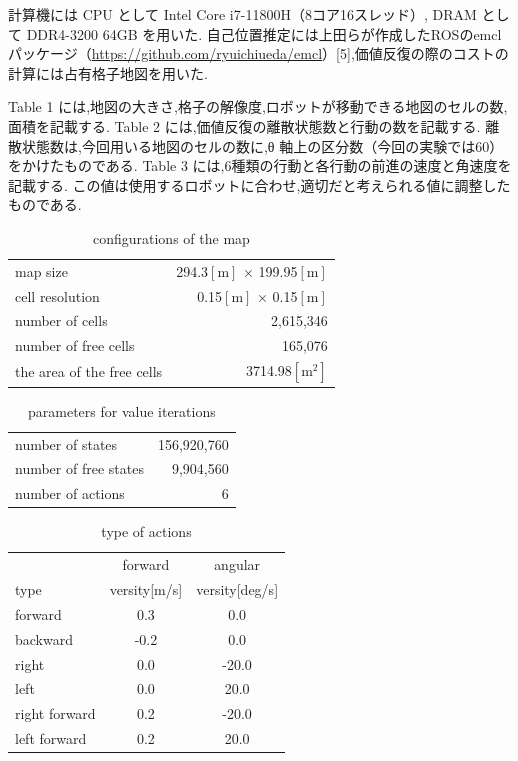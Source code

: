 \documentclass{jarticle}
\begin{document}
計算機には CPU として Intel Core i7-11800H（8コア16スレッド）, DRAM として DDR4-3200 64GB を用いた.
自己位置推定には上田らが作成したROSのemclパッケージ（\href{https://github.com/ryuichiueda/emcl}{https://github.com/ryuichiueda/emcl}）[5],価値反復の際のコストの計算には占有格子地図を用いた.

Table 1 には,地図の大きさ,格子の解像度,ロボットが移動できる地図のセルの数,面積を記載する.
Table 2 には,価値反復の離散状態数と行動の数を記載する.
離散状態数は,今回用いる地図のセルの数に,θ 軸上の区分数（今回の実験では60）をかけたものである.
Table 3 には,6種類の行動と各行動の前進の速度と角速度を記載する.
この値は使用するロボットに合わせ,適切だと考えられる値に調整したものである.

\begin{table}[hbtp]
  \caption{conﬁgurations of the map}
  \centering
  \begin{tabular}{l|r}
    \hline
    map size & 294.3$\mathrm{[m]}$ × 199.95$\mathrm{[m]}$\\
    cell resolution &  0.15$\mathrm{[m]}$ × 0.15$\mathrm{[m]}$ \\
		number of cells & 2,615,346\\
    number of free cells & 165,076\\
		the area of the free cells & 3714.98$\mathrm{[m^2]}$\\
    \hline
  \end{tabular}
\end{table}

\begin{table}[hbtp]
	\caption{parameters for value iterations}
  \centering
  \begin{tabular}{l|r}
    \hline
    number of states & 156,920,760\\
    number of free states &  9,904,560\\
		number of actions & 6\\
    \hline
  \end{tabular}
\end{table}

\begin{table}[hbtp]
	\caption{type of actions}
	\centering
	\begin{tabular}{l|cc}
 		\hline
		& forward & angular \\
 		type & versity[m/s] & versity[deg/s] \\
 		\hline \hline
 		forward & 0.3 & 0.0 \\
 		backward & -0.2 & 0.0 \\
 		right & 0.0 & -20.0 \\
 		left & 0.0 & 20.0 \\
 		right forward & 0.2 & -20.0 \\
 		left forward & 0.2 & 20.0 \\
	 \hline
	\end{tabular}
\end{table}
\end{document}
